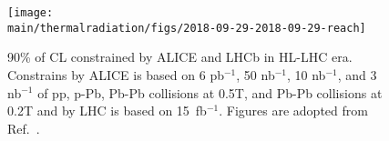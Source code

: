 \documentclass[../report.tex]{subfiles}
\providecommand{\main}{..}
\begin{document}
\begin{figure}[htbp]
\begin{center}
\texttt{[image: \\main/thermalradiation/figs/2018-09-29-2018-09-29-reach]}
\end{center}
\caption{90\% of CL constrained by ALICE and LHCb in HL-LHC era.
Constrains by ALICE is based on 
6 pb$^{-1}$, 50 nb$^{-1}$, 10 nb$^{-1}$, and 3 nb$^{-1}$
of pp, p-Pb, Pb-Pb collisions at 0.5T, and Pb-Pb collisions at 0.2T 
and by LHC is based on 15~fb$^{-1}$.
Figures are adopted from Ref.~\cite{Ilten:2018crw}.}
\label{fig:darkphoton_alice_lhcb_hllhc}
\end{figure}




\end{document}
